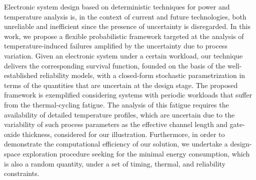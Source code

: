 Electronic system design based on deterministic techniques for power and temperature analysis is, in the context of current and future technologies, both unreliable and inefficient since the presence of uncertainty is disregarded.
In this work, we propose a flexible probabilistic framework targeted at the analysis of temperature-induced failures amplified by the uncertainty due to process variation.
Given an electronic system under a certain workload, our technique delivers the corresponding survival function, founded on the basis of the well-established reliability models, with a closed-form stochastic parametrization in terms of the quantities that are uncertain at the design stage.
The proposed framework is exemplified considering systems with periodic workloads that suffer from the thermal-cycling fatigue.
The analysis of this fatigue requires the availability of detailed temperature profiles, which are uncertain due to the variability of such process parameters as the effective channel length and gate-oxide thickness, considered for our illustration.
Furthermore, in order to demonstrate the computational efficiency of our solution, we undertake a design-space exploration procedure seeking for the minimal energy consumption, which is also a random quantity, under a set of timing, thermal, and reliability constraints.
